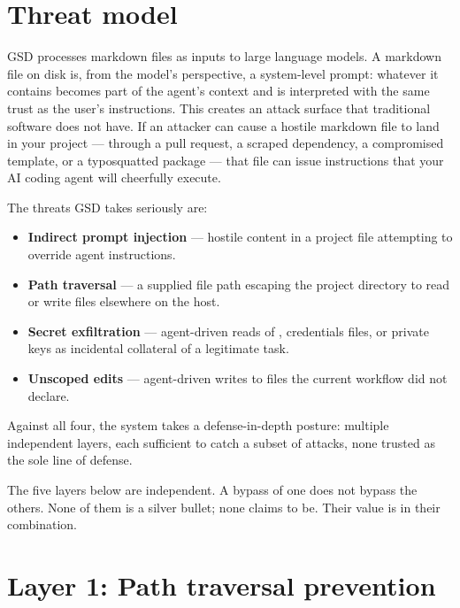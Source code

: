 \documentclass[11pt,letterpaper,openany]{book}
\begin{document}
\section{Threat model}

GSD processes markdown files as inputs to large language models. A markdown file on disk is, from the model's perspective, a system-level prompt: whatever it contains becomes part of the agent's context and is interpreted with the same trust as the user's instructions. This creates an attack surface that traditional software does not have. If an attacker can cause a hostile markdown file to land in your project — through a pull request, a scraped dependency, a compromised template, or a typosquatted package — that file can issue instructions that your AI coding agent will cheerfully execute.

The threats GSD takes seriously are:

\begin{itemize}[leftmargin=1.2em]
  \item \textbf{Indirect prompt injection} — hostile content in a project file attempting to override agent instructions.
  \item \textbf{Path traversal} — a supplied file path escaping the project directory to read or write files elsewhere on the host.
  \item \textbf{Secret exfiltration} — agent-driven reads of , credentials files, or private keys as incidental collateral of a legitimate task.
  \item \textbf{Unscoped edits} — agent-driven writes to files the current workflow did not declare.
\end{itemize}

Against all four, the system takes a defense-in-depth posture: multiple independent layers, each sufficient to catch a subset of attacks, none trusted as the sole line of defense.

\begin{tcolorbox}[colback=gsdnotebg,colframe=gsdnotebar,title=\textbf{Defense in depth}]
The five layers below are independent. A bypass of one does not bypass the others. None of them is a silver bullet; none claims to be. Their value is in their combination.
\end{tcolorbox}

\section{Layer 1: Path traversal prevention}
\end{document}
